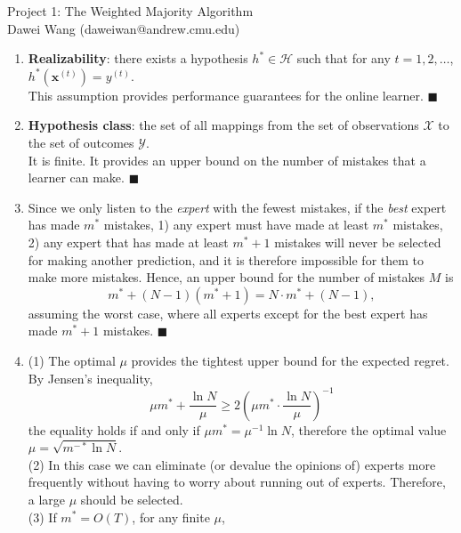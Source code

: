\documentclass{article}
\renewcommand{\vec}[1]{\mathbf{#1}}
\newcommand{\qed}{\hfill$\blacksquare$}
\begin{document}
\RaggedRight
\pagestyle{fancy}


{\large Project 1: The Weighted Majority Algorithm} \\[0.5\parsep]
Dawei Wang (daweiwan@andrew.cmu.edu)

\vfill

\begin{enumerate}
	\item {\bf Realizability}: there exists a hypothesis $h^*\in\mathcal{H}$ such that
		for any $t=1,2,\dots$, $h^*(\vec x^{(t)})=y^{(t)}$. \\ This assumption provides 
		performance guarantees for the online learner. \qed
	\item {\bf Hypothesis class}: the set of all mappings from the set of observations $\mathcal{X}$
		to the set of outcomes $\mathcal{Y}$. \\ It is finite. It provides an upper
		bound on the number of mistakes that a learner can make. \qed
	\item Since we only listen to the \emph{expert} with the fewest mistakes, if the \emph{best}
		expert has made $m^*$ mistakes, 1) any expert must have made at least $m^*$ mistakes, 2) 
		any expert that has made at least $m^*+1$ mistakes will never be selected for making
		another prediction, and it is therefore impossible for them to make more mistakes. Hence,
		an upper bound for the number of mistakes $M$ is
		\begin{equation}
			m^*+(N-1)(m^*+1)=N\cdot m^*+(N-1), 
		\end{equation}
		assuming the worst case, where all experts except for the best expert has made $m^*+1$ mistakes. \qed
	\item (1) The optimal $\mu$ provides the tightest upper bound for the expected regret. By Jensen's inequality, 
		\begin{equation}
			\mu m^*+\frac{\ln N}{\mu}\ge 2\left(\mu m^*\cdot\frac{\ln N}{\mu}\right)^{-1}
		\end{equation}
		the equality holds if and only if $\mu m^*=\mu^{-1}\ln N$, therefore the optimal value	
		$\mu=\sqrt{m^{-*}\ln N}$. \\[\parsep]
		(2) In this case we can eliminate (or devalue the opinions of) experts more frequently without
		having to worry about running out of experts. Therefore, a large $\mu$ should be selected.\\[\parsep]
		(3) If $m^*=O(T)$, for any finite $\mu$, 

\end{enumerate}
\end{document}
